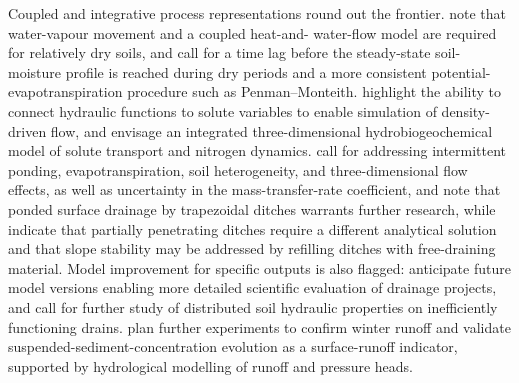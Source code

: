 Coupled and integrative process representations round out the frontier.
\textcite{Moroizumi2004} note that water-vapour movement and a coupled heat-and-
water-flow model are required for relatively dry soils, and
\textcite{Koivusalo1999} call for a time lag before the steady-state soil-
moisture profile is reached during dry periods and a more consistent
potential-evapotranspiration procedure such as Penman--Monteith.
\textcite{Salo2015} highlight the ability to connect hydraulic functions to
solute variables to enable simulation of density-driven flow, and
\textcite{Varvaris2018} envisage an integrated three-dimensional
hydrobiogeochemical model of solute transport and nitrogen dynamics.
\textcite{Zhang2024} call for addressing intermittent ponding,
evapotranspiration, soil heterogeneity, and three-dimensional flow effects, as
well as uncertainty in the mass-transfer-rate coefficient, and
\textcite{Afruzi2014} note that ponded surface drainage by trapezoidal ditches
warrants further research, while \textcite{Chahar2010} indicate that partially
penetrating ditches require a different analytical solution and that slope
stability may be addressed by refilling ditches with free-draining material.
Model improvement for specific outputs is also flagged: \textcite{Verma2014}
anticipate future model versions enabling more detailed scientific evaluation
of drainage projects, and \textcite{Nousiainen2015} call for further study of
distributed soil hydraulic properties on inefficiently functioning drains.
\textcite{Augeard2005} plan further experiments to confirm winter runoff and
validate suspended-sediment-concentration evolution as a surface-runoff
indicator, supported by hydrological modelling of runoff and pressure heads.

